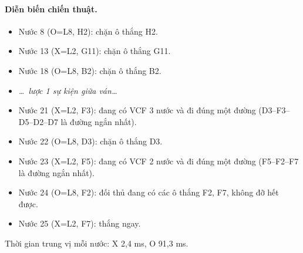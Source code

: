 \paragraph{Diễn biến chiến thuật.}
\begin{itemize}\footnotesize\linespread{1.1}\selectfont
\setlength{\itemsep}{0pt}
  \item Nước 8 (O=L8, H2): chặn ô thắng H2.
  \item Nước 13 (X=L2, G11): chặn ô thắng G11.
  \item Nước 18 (O=L8, B2): chặn ô thắng B2.
  \item[] \emph{\dots\ lược 1 sự kiện giữa ván\dots}
  \item Nước 21 (X=L2, F3): đang có VCF 3 nước và đi đúng một đường (D3--F3--D5--D2--D7 là đường ngắn nhất).
  \item Nước 22 (O=L8, D3): chặn ô thắng D3.
  \item Nước 23 (X=L2, F5): đang có VCF 2 nước và đi đúng một đường (F5--F2--F7 là đường ngắn nhất).
  \item Nước 24 (O=L8, F2): đối thủ đang có các ô thắng F2, F7, không đỡ hết được.
  \item Nước 25 (X=L2, F7): thắng ngay.
\end{itemize}
Thời gian trung vị mỗi nước: X 2,4 ms, O 91,3 ms.
\clearpage

